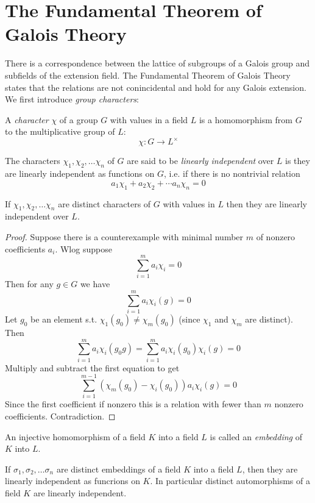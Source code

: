 \documentclass[a4paper]{article}
\begin{document}
\section{The Fundamental Theorem of Galois Theory}
There is a correspondence between the lattice of subgroups of a Galois group and subfields of the extension field. The Fundamental Theorem of Galois Theory states that the relations are not conincidental and hold for any Galois extension. We first introduce \emph{group characters}:

\begin{defi}
    A \emph{character} $\chi$ of a group $G$ with values in a field $L$ is a homomorphism from $G$ to the multiplicative group of $L$:
    \[
        \chi: G \rightarrow L^\times
    \]
\end{defi}

\begin{defi}
    The characters $\chi_1, \chi_2, \ldots \chi_n$ of $G$ are said to be \emph{linearly independent} over $L$ is they are linearly independent as functions on $G$, i.e. if there is no nontrivial relation
    \[
        a_1 \chi_1 + a_2 \chi_2 + \cdots a_n \chi_n = 0
    \]
\end{defi}

\begin{thm}
    If $\chi_1, \chi_2, \ldots \chi_n$ are distinct characters of $G$ with values in $L$ then they are linearly independent over $L$.
\end{thm}

\begin{proof}
    Suppose there is a counterexample with minimal number $m$ of nonzero coefficients $a_i$. Wlog suppose
    \[
        \sum_{i=1}^m a_i \chi_i = 0
    \]
    Then for any $g \in G$ we have
    \[
        \sum_{i=1}^m a_i \chi_i(g) = 0
    \]
    Let $g_0$ be an element s.t. $\chi_1(g_0) ≠ \chi_m(g_0)$ (since $\chi_1$ and $\chi_m$ are distinct). Then
    \[
        \sum_{i=1}^m a_i \chi_i(g_0 g) = \sum_{i=1}^m a_i \chi_i(g_0) \chi_i(g) = 0
    \]
    Multiply and subtract the first equation to get
    \[
        \sum_{i=1}^{m-1} (\chi_m(g_0) - \chi_i(g_0))a_i \chi_i(g) = 0
    \]
    Since the first coefficient if nonzero this is a relation with fewer than $m$ nonzero coefficients. Contradiction.
\end{proof}

An injective homomorphism of a field $K$ into a field $L$ is called an \emph{embedding} of $K$ into $L$.

\begin{cor}
  If $\sigma_1, \sigma_2, \ldots \sigma_n$ are distinct embeddings of a field $K$ into a field $L$, then they are linearly independent as funcrions on $K$. In particular distinct automorphisms of a field $K$ are linearly independent.
\end{cor}
\end{document}
